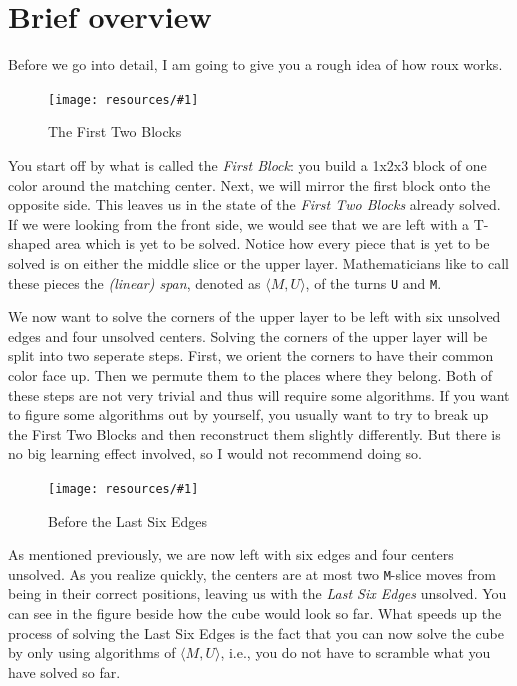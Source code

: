\documentclass[a4paper]{scrreprt}
\newcommand{\img}[3]{
	\begin{figure}[ht]
	\centering
  \texttt{[image: resources/\#1]}
	\caption*{#3}
	\end{figure}
}
\begin{document}
\section{Brief overview}

Before we go into detail, I am going to give you a rough idea of how roux works.\par

\img{f2b_transparent.png}{0.3}{The First Two Blocks}

You start off by what is called the \emph{First Block}: you build a 1x2x3 block of one color around the matching center. Next, we will mirror the first block onto the opposite side. This leaves us in the state of the \emph{First Two Blocks} already solved. If we were looking from the front side, we would see that we are left with a T-shaped area which is yet to be solved. Notice how every piece that is yet to be solved is on either the middle slice or the upper layer. Mathematicians like to call these pieces the \emph{(linear) span}, denoted as $\langle M, U \rangle$, of the turns \texttt{U} and \texttt{M}.\par

We now want to solve the corners of the upper layer to be left with six unsolved edges and four unsolved centers. Solving the corners of the upper layer will be split into two seperate steps. First, we orient the corners to have their common color face up. Then we permute them to the places where they belong. Both of these steps are not very trivial and thus will require some algorithms. If you want to figure some algorithms out by yourself, you usually want to try to break up the First Two Blocks and then reconstruct them slightly differently. But there is no big learning effect involved, so I would not recommend doing so.\par

\img{lse.png}{0.3}{Before the Last Six Edges}

As mentioned previously, we are now left with six edges and four centers unsolved. As you realize quickly, the centers are at most two \texttt{M}-slice moves from being in their correct positions, leaving us with the \emph{Last Six Edges} unsolved. You can see in the figure beside how the cube would look so far. What speeds up the process of solving the Last Six Edges is the fact that you can now solve the cube by only using algorithms of $\langle M, U\rangle$, i.e., you do not have to scramble what you have solved so far.\par
\end{document}
